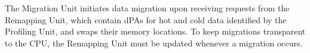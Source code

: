 The Migration Unit initiates data migration upon receiving requests from the Remapping Unit, which contain dPAs for hot and cold data identified by the Profiling Unit, and swaps their memory locations. To keep migrations transparent to the CPU, the Remapping Unit must be updated whenever a migration occurs. 







